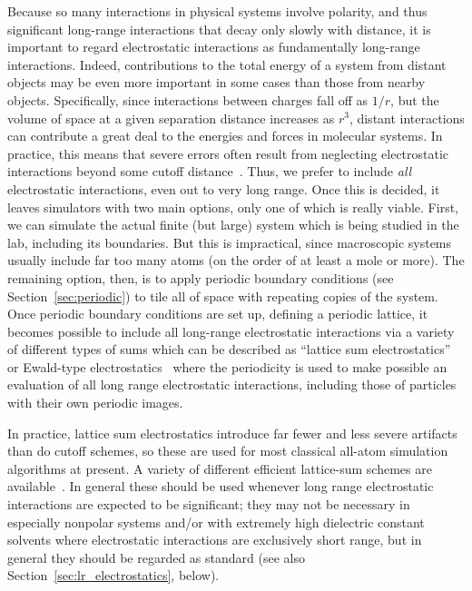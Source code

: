 \documentclass[9pt,bestpractices]{livecoms}
\begin{document}
Because so many interactions in physical systems involve polarity, and thus significant long-range interactions that decay only slowly with distance, it is important to regard electrostatic interactions as fundamentally long-range interactions.
Indeed, contributions to the total energy of a system from distant objects may be even more important in some cases than those from nearby objects.
Specifically, since interactions between charges fall off as $1/r$, but the volume of space at a given separation distance increases as $r^3$, distant interactions can contribute a great deal to the energies and forces in molecular systems.
In practice, this means that severe errors often result from neglecting electrostatic interactions beyond some cutoff distance~\cite{LeachBook, York:1993:J.Chem.Phys., Darden:1993:J.Chem.Phys., Piana:2012:PLOSONE, Sagui:1999:Annu.Rev.Biophys.Biomol.Struct.}. 
Thus, we prefer to include \emph{all} electrostatic interactions, even out to very long range. 
Once this is decided, it  leaves simulators with two main options, only one of which is really viable.
First, we can simulate the actual finite (but large) system which is being studied in the lab, including its boundaries.
But this is impractical, since macroscopic systems usually include far too many atoms (on the order of at least a mole or more).
The remaining option, then, is to apply periodic boundary conditions (see Section~\ref{sec:periodic}) to tile all of space with repeating copies of the system. 
Once periodic boundary conditions are set up, defining a periodic lattice, it becomes possible to include all long-range electrostatic interactions via a variety of different types of sums which can be described as ``lattice sum electrostatics'' or Ewald-type electrostatics~\cite{Sagui:1999:Annu.Rev.Biophys.Biomol.Struct., Cisneros:2014:Chem.Rev.} where the periodicity is used to make possible an evaluation of all long range electrostatic interactions, including those of particles with their own periodic images.

In practice, lattice sum electrostatics introduce far fewer and less severe artifacts than do cutoff schemes, so these are used for most classical all-atom simulation algorithms at present. 
A variety of different efficient lattice-sum schemes are available~\cite{Cisneros:2014:Chem.Rev.}.
In general these should be used whenever long range electrostatic interactions are expected to be significant; they may not be necessary in especially nonpolar systems and/or with extremely high dielectric constant solvents where electrostatic interactions are exclusively short range, but in general they should be regarded as standard (see also Section~\ref{sec:lr_electrostatics}, below). 
\end{document}
